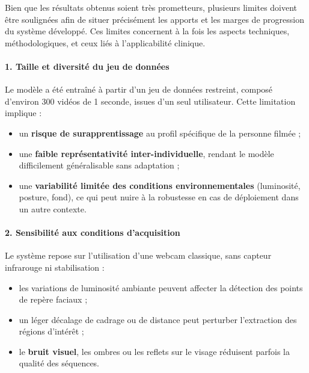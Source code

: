 \documentclass[
]{article}
\begin{document}
Bien que les résultats obtenus soient très prometteurs, plusieurs limites doivent être soulignées afin de situer précisément les apports et les marges de progression du système développé. Ces limites concernent à la fois les aspects techniques, méthodologiques, et ceux liés à l'applicabilité clinique.

\hypertarget{taille-et-diversituxe9-du-jeu-de-donnuxe9es}{%
\paragraph{\texorpdfstring{\textbf{1. Taille et diversité du jeu de données}}{1. Taille et diversité du jeu de données}}\label{taille-et-diversituxe9-du-jeu-de-donnuxe9es}}

Le modèle a été entraîné à partir d'un jeu de données restreint, composé d'environ 300 vidéos de 1 seconde, issues d'un seul utilisateur. Cette limitation implique :

\begin{itemize}
\item
  un \textbf{risque de surapprentissage} au profil spécifique de la personne filmée ;
\item
  une \textbf{faible représentativité inter-individuelle}, rendant le modèle difficilement généralisable sans adaptation ;
\item
  une \textbf{variabilité limitée des conditions environnementales} (luminosité, posture, fond), ce qui peut nuire à la robustesse en cas de déploiement dans un autre contexte.
\end{itemize}

\hypertarget{sensibilituxe9-aux-conditions-dacquisition}{%
\paragraph{\texorpdfstring{\textbf{2. Sensibilité aux conditions d'acquisition}}{2. Sensibilité aux conditions d'acquisition}}\label{sensibilituxe9-aux-conditions-dacquisition}}

Le système repose sur l'utilisation d'une webcam classique, sans capteur infrarouge ni stabilisation :

\begin{itemize}
\item
  les variations de luminosité ambiante peuvent affecter la détection des points de repère faciaux ;
\item
  un léger décalage de cadrage ou de distance peut perturber l'extraction des régions d'intérêt ;
\item
  le \textbf{bruit visuel}, les ombres ou les reflets sur le visage réduisent parfois la qualité des séquences.
\end{itemize}
\end{document}
